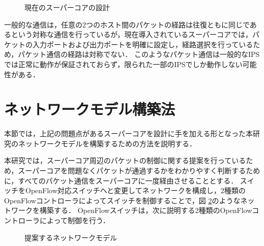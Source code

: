 \begin{figure}[tb]
\begin{center}
\caption{現在のスーパーコアの設計}
\label{fig:3-0}
\end{center}
\end{figure}

一般的な通信は，任意の2つのホスト間のパケットの経路は往復ともに同じであるという対称な通信を行っているが，現在導入されているスーパーコアでは，パケットの入力ポートおよび出力ポートを明確に設定し，経路選択を行っているため，パケット通信の経路は対称でない．
このようなパケット通信は一般的なIPSでは正常に動作が保証されておらず，限られた一部のIPSでしか動作しない可能性がある．

\section{ネットワークモデル構築法}

本節では，上記の問題点があるスーパーコアを設計に手を加える形となった本研究のネットワークモデルを構築するための方法を説明する．

本研究では，スーパーコア周辺のパケットの制御に関する提案を行っているため，スーパーコアを問題なくパケットが通過するかをわかりやすく判断するために，すべてのパケット通信をスーパーコアに一度経由させることとする．
スイッチをOpenFlow対応スイッチへと変更してネットワークを構成し，2種類のOpenFlowコントローラによってスイッチを制御することで，図 \ref{fig:3-1}のようなネットワークを構築する．
OpenFlowスイッチは，次に説明する2種類のOpenFlowコントローラによって制御を行う．

\begin{figure}[tb]
\begin{center}
\caption{提案するネットワークモデル}
\label{fig:3-1}
\end{center}
\end{figure}

